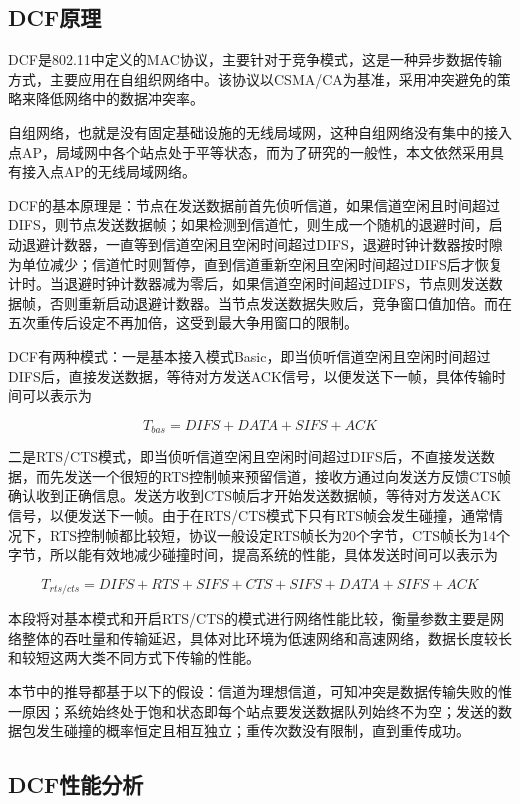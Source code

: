 \documentclass{article}
\begin{document}
\subsection{DCF原理}
DCF是802.11中定义的MAC协议，主要针对于竞争模式，这是一种异步数据传输方式，主要应用在自组织网络中。该协议以CSMA/CA为基准，采用冲突避免的策略来降低网络中的数据冲突率。

自组网络，也就是没有固定基础设施的无线局域网，这种自组网络没有集中的接入点AP，局域网中各个站点处于平等状态，而为了研究的一般性，本文依然采用具有接入点AP的无线局域网络。

DCF的基本原理是：节点在发送数据前首先侦听信道，如果信道空闲且时间超过DIFS，则节点发送数据帧；如果检测到信道忙，则生成一个随机的退避时间，启动退避计数器，一直等到信道空闲且空闲时间超过DIFS，退避时钟计数器按时隙为单位减少；信道忙时则暂停，直到信道重新空闲且空闲时间超过DIFS后才恢复计时。当退避时钟计数器减为零后，如果信道空闲时间超过DIFS，节点则发送数据帧，否则重新启动退避计数器。当节点发送数据失败后，竞争窗口值加倍。而在五次重传后设定不再加倍，这受到最大争用窗口的限制。

DCF有两种模式：一是基本接入模式Basic，即当侦听信道空闲且空闲时间超过DIFS后，直接发送数据，等待对方发送ACK信号，以便发送下一帧，具体传输时间可以表示为

\begin{equation}
T_{bas} = DIFS + DATA + SIFS + ACK
\end{equation}

二是RTS/CTS模式，即当侦听信道空闲且空闲时间超过DIFS后，不直接发送数据，而先发送一个很短的RTS控制帧来预留信道，接收方通过向发送方反馈CTS帧确认收到正确信息。发送方收到CTS帧后才开始发送数据帧，等待对方发送ACK信号，以便发送下一帧。由于在RTS/CTS模式下只有RTS帧会发生碰撞，通常情况下，RTS控制帧都比较短，协议一般设定RTS帧长为20个字节，CTS帧长为14个字节，所以能有效地减少碰撞时间，提高系统的性能，具体发送时间可以表示为

\begin{equation}
T_{rts/cts} = DIFS + RTS + SIFS + CTS + SIFS + DATA + SIFS + ACK
\end{equation}

本段将对基本模式和开启RTS/CTS的模式进行网络性能比较，衡量参数主要是网络整体的吞吐量和传输延迟，具体对比环境为低速网络和高速网络，数据长度较长和较短这两大类不同方式下传输的性能。

本节中的推导都基于以下的假设：信道为理想信道，可知冲突是数据传输失败的惟一原因；系统始终处于饱和状态即每个站点要发送数据队列始终不为空；发送的数据包发生碰撞的概率恒定且相互独立；重传次数没有限制，直到重传成功。
\subsection{DCF性能分析}
\end{document}

